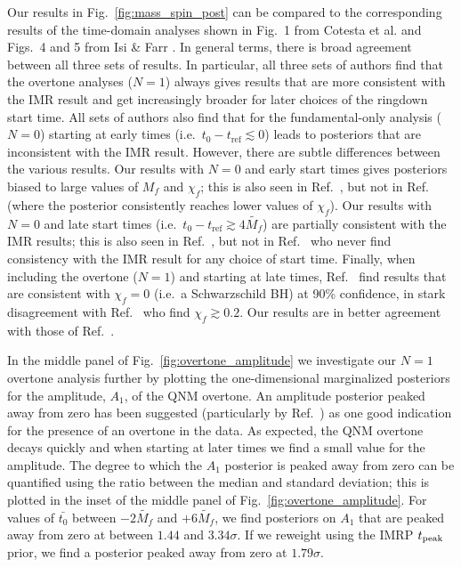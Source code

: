 Our results in Fig.~\ref{fig:mass_spin_post} can be compared to the corresponding results of the time-domain analyses shown in Fig.~1 from Cotesta et al. \cite{Cotesta:2022pci} and Figs.~4 and 5 from Isi \& Farr \cite{Isi:2022mhy}.
In general terms, there is broad agreement between all three sets of results. 
In particular, all three sets of authors find that the overtone analyses ($N=1$) always gives results that are more consistent with the IMR result and get increasingly broader for later choices of the ringdown start time.
All sets of authors also find that for the fundamental-only analysis ($N=0$) starting at early times (i.e.\ $t_0  - t_\mathrm{ref}\lesssim 0$) leads to posteriors that are inconsistent with the IMR result.
However, there are subtle differences between the various results.
Our results with $N=0$ and early start times gives posteriors biased to large values of $M_f$ and $\chi_f$; this is also seen in Ref.~\cite{Isi:2022mhy}, but not in Ref.~\cite{Cotesta:2022pci} (where the posterior consistently reaches lower values of $\chi_f$).
Our results with $N=0$ and late start times (i.e.\ $t_0 - t_\mathrm{ref}\gtrsim 4\tilde{M_f}$) are partially consistent with the IMR results; this is also seen in Ref.~\cite{Cotesta:2022pci}, but not in Ref.~\cite{Isi:2022mhy} who never find consistency with the IMR result for any choice of start time.
Finally, when including the overtone ($N=1$) and starting at late times, Ref.~\cite{Cotesta:2022pci} find results that are consistent with $\chi_f=0$ (i.e.\ a Schwarzschild BH) at 90\% confidence, in stark disagreement with Ref.~\cite{Isi:2022mhy} who find $\chi_f\gtrsim 0.2$. 
Our results are in better agreement with those of Ref.~\cite{Isi:2022mhy}.

In the middle panel of Fig.~\ref{fig:overtone_amplitude} we investigate our $N=1$ overtone analysis further by plotting the one-dimensional marginalized posteriors for the amplitude, $A_1$, of the QNM overtone.
An amplitude posterior peaked away from zero has been suggested (particularly by Ref.~\cite{Isi:2019aib}) as one good indication for the presence of an overtone in the data.
As expected, the QNM overtone decays quickly and when starting at later times we find a small value for the amplitude.
The degree to which the $A_1$ posterior is peaked away from zero can be quantified using the ratio between the median and standard deviation; this is plotted in the inset of the middle panel of Fig.~\ref{fig:overtone_amplitude}.
For values of $\bar{t_0}$ between $-2\tilde{M_f}$ and $+6\tilde{M_f}$, we find posteriors on $A_1$ that are peaked away from zero at between $1.44$ and $3.34\sigma$.
If we reweight using the IMRP $t_{\rm peak}$ prior, we find a posterior peaked away from zero at $1.79\sigma$.

